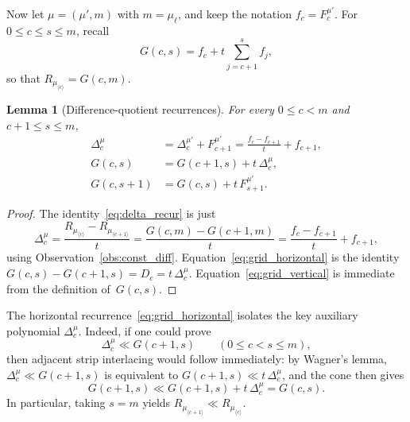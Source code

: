 \documentclass[11pt,reqno]{amsart}
\newtheorem{lemma}[theorem]{Lemma}
\theoremstyle{definition}
\newcommand{\interl}{\ll}
\begin{document}
Now let $\mu = (\mu', m)$ with $m = \mu_\ell$, and keep the notation
$f_c = F_c^{\mu'}$.
For $0 \leq c \leq s \leq m$, recall
\[
  G(c,s) = f_c + t \sum_{j=c+1}^{s} f_j,
\]
so that $R_{\mu_{\langle c \rangle}} = G(c,m)$.

\begin{lemma}[Difference-quotient recurrences]\label{lem:delta_grid}
For every $0 \leq c < m$ and $c+1 \leq s \leq m$,
\begin{align}
  \Delta_c^\mu
    &= \Delta_c^{\mu'} + F_{c+1}^{\mu'}
     = \frac{f_c - f_{c+1}}{t} + f_{c+1}, \label{eq:delta_recur} \\
  G(c,s)
    &= G(c+1,s) + t\,\Delta_c^\mu, \label{eq:grid_horizontal} \\
  G(c,s+1)
    &= G(c,s) + t\,F_{s+1}^{\mu'}. \label{eq:grid_vertical}
\end{align}
\end{lemma}
\begin{proof}
The identity~\eqref{eq:delta_recur} is just
\[
  \Delta_c^\mu
  = \frac{R_{\mu_{\langle c \rangle}} - R_{\mu_{\langle c+1 \rangle}}}{t}
  = \frac{G(c,m) - G(c+1,m)}{t}
  = \frac{f_c - f_{c+1}}{t} + f_{c+1},
\]
using Observation~\ref{obs:const_diff}.
Equation~\eqref{eq:grid_horizontal} is the identity
$G(c,s)-G(c+1,s) = D_c = t\,\Delta_c^\mu$.
Equation~\eqref{eq:grid_vertical} is immediate from the definition of~$G(c,s)$.
\end{proof}

The horizontal recurrence~\eqref{eq:grid_horizontal} isolates the key
auxiliary polynomial $\Delta_c^\mu$.
Indeed, if one could prove
\begin{equation}\label{eq:delta_suffices}
  \Delta_c^\mu \interl G(c+1,s)
  \qquad (0 \leq c < s \leq m),
\end{equation}
then adjacent strip interlacing would follow immediately:
by Wagner's lemma,
$\Delta_c^\mu \interl G(c+1,s)$ is equivalent to
$G(c+1,s) \interl t\,\Delta_c^\mu$,
and the cone then gives
\[
  G(c+1,s)
  \interl G(c+1,s) + t\,\Delta_c^\mu
  = G(c,s).
\]
In particular, taking $s=m$ yields
$R_{\mu_{\langle c+1 \rangle}} \interl R_{\mu_{\langle c \rangle}}$.
\end{document}
